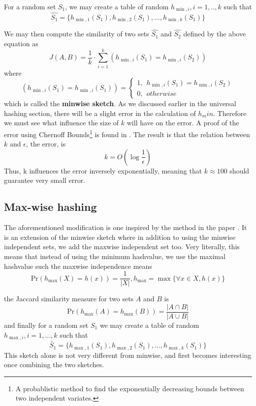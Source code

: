 \documentclass[../../main.tex]{subfiles}
\begin{document}
For a random set $S_1$, we may create a table of random $h_{\min,i},i=1,..,k$ such that
$$
\hat{S_1} = \{ h_{\min,1}(S_1),h_{\min,2}(S_1),...,h_{\min,k}(S_1)\}
$$

We may then compute the similarity of two sets $\hat{S_1}$ and $\hat{S_2}$ defined by the above equation as
\begin{equation}\label{jacsketch}
J(A,B)=\frac{1}{k}\cdot \sum_{i=1}^k (h_{\min,i}(S_1) = h_{\min,i}(S_2))
\end{equation}
where
$$
(h_{\min,i}(S_1) = h_{\min,i}(S_1)) = \left\{ \begin{array}{ll}
												1, \ \ h_{\min,i}(S_1)=h_{\min,i}(S_2)\\
												0, \ \ otherwise
											  \end{array}\right.
$$
which is called the \textbf{minwise sketch}. As we discussed earlier in the universal hashing section, there will be a slight error in the calculation of $h_min$. Therefore we must see what influence the size of $k$ will have on the error. A proof of the error using Chernoff Bounds\footnote{A probablistic method to find the exponentially decreasing bounds between two independent variates.} is found in \cite{errorMinhash}. The result is that the relation between $k$ and $\epsilon$, the error, is 
$$
k=O\left(\log \frac{1}{\epsilon}\right)
$$
Thus, k influences the error inversely exponentially, meaning that $k\approx 100$ should guarantee very small error.

\subsection{Max-wise hashing}

The aforementioned modification is one inspired by the method in the paper \cite{minmaxhash}. It is an extension of the minwise sketch where in addition to using the minwise independent sets, we add the maxwise independent set too. Very literally, this means that instead of using the minimum hashvalue, we use the maximal hashvalue such the maxwise independence means
\begin{equation}\label{maxwise}
\mathrm{Pr}(h_{\max}(X)=h(x))=\frac{1}{|X|}, h_{\max}=\max\{\forall x \in X, h(x)\} 
\end{equation}

the Jaccard similarity measure for two sets $A$ and $B$ is
\begin{equation}\label{maxwisejaccard}
\mathrm{Pr}(h_{\max}(A)=h_{\max}(B))=\frac{|A\cap B|}{|A\cup B|}
\end{equation}
and finally for a random set $S_1$ we may create a table of random $h_{\max,i},i=1,...,k$ such that
$$
\tilde{S_1} = \{ h_{\max,1}(S_1),h_{\max,2}(S_1),...,h_{\max,k}(S_1)\}
$$
This sketch alone is not very different from minwise, and first becomes interesting once combining the two sketches.
\end{document}
